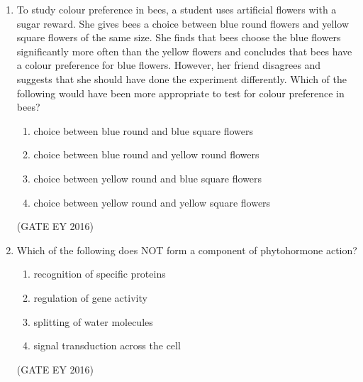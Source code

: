 \documentclass[journal]{IEEEtran}
\begin{document}
\begin{enumerate}[label=Q.\arabic*.]
\item To study colour preference in bees, a student uses artificial flowers with a sugar reward. She gives bees a choice between blue round flowers and yellow square flowers of the same size. She finds that bees choose the blue flowers significantly more often than the yellow flowers and concludes that bees have a colour preference for blue flowers. However, her friend disagrees and suggests that she should have done the experiment differently. Which of the following would have been more appropriate to test for colour preference in bees?
\begin{enumerate}
    \item choice between blue round and blue square flowers
    \item choice between blue round and yellow round flowers
    \item choice between yellow round and blue square flowers
    \item choice between yellow round and yellow square flowers
\end{enumerate}
\hfill{(GATE EY 2016)}

\item Which of the following does NOT form a component of phytohormone action?
\begin{multicols}{2}
\begin{enumerate}
    \item recognition of specific proteins
    \item regulation of gene activity
    \item splitting of water molecules
    \item signal transduction across the cell
\end{enumerate}
\end{multicols}
\hfill{(GATE EY 2016)}


\end{enumerate}
\end{document}
